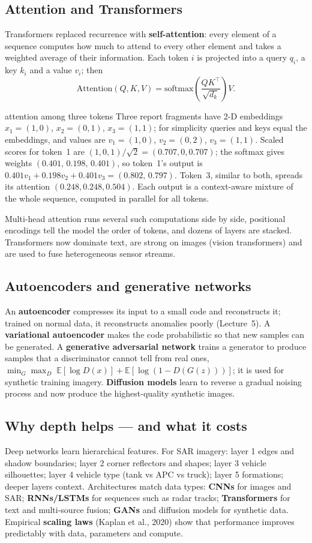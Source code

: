 \documentclass[11pt]{article}
\begin{document}
\subsection{Attention and Transformers}
Transformers replaced recurrence with \textbf{self-attention}: every element of a sequence computes how much to attend to every other element and takes a weighted average of their information. Each token $i$ is projected into a query $q_i$, a key $k_i$ and a value $v_i$; then
\[\text{Attention}(Q,K,V)=\text{softmax}\!\left(\frac{QK^\top}{\sqrt{d_k}}\right)V.\]
\begin{example}{attention among three tokens}
Three report fragments have 2-D embeddings $x_1=(1,0)$, $x_2=(0,1)$, $x_3=(1,1)$; for simplicity queries and keys equal the embeddings, and values are $v_1=(1,0)$, $v_2=(0,2)$, $v_3=(1,1)$. Scaled scores for token~1 are $(1,0,1)/\sqrt2=(0.707,0,0.707)$; the softmax gives weights $(0.401,\,0.198,\,0.401)$, so token~1's output is $0.401v_1+0.198v_2+0.401v_3=(0.802,\,0.797)$. Token~3, similar to both, spreads its attention $(0.248,0.248,0.504)$. Each output is a context-aware mixture of the whole sequence, computed in parallel for all tokens.
\end{example}
Multi-head attention runs several such computations side by side, positional encodings tell the model the order of tokens, and dozens of layers are stacked. Transformers now dominate text, are strong on images (vision transformers) and are used to fuse heterogeneous sensor streams.

\subsection{Autoencoders and generative networks}
An \textbf{autoencoder} compresses its input to a small code and reconstructs it; trained on normal data, it reconstructs anomalies poorly (Lecture~5). A \textbf{variational autoencoder} makes the code probabilistic so that new samples can be generated. A \textbf{generative adversarial network} trains a generator to produce samples that a discriminator cannot tell from real ones, $\min_G\max_D\;\mathbb E[\log D(x)]+\mathbb E[\log(1-D(G(z)))]$; it is used for synthetic training imagery. \textbf{Diffusion models} learn to reverse a gradual noising process and now produce the highest-quality synthetic images.

\subsection{Why depth helps --- and what it costs}
Deep networks learn hierarchical features. For SAR imagery: layer 1 edges and shadow boundaries; layer 2 corner reflectors and shapes; layer 3 vehicle silhouettes; layer 4 vehicle type (tank vs APC vs truck); layer 5 formations; deeper layers context. Architectures match data types: \textbf{CNNs} for images and SAR; \textbf{RNNs/LSTMs} for sequences such as radar tracks; \textbf{Transformers} for text and multi-source fusion; \textbf{GANs} and diffusion models for synthetic data. Empirical \textbf{scaling laws} (Kaplan et al., 2020) show that performance improves predictably with data, parameters and compute.
\end{document}
